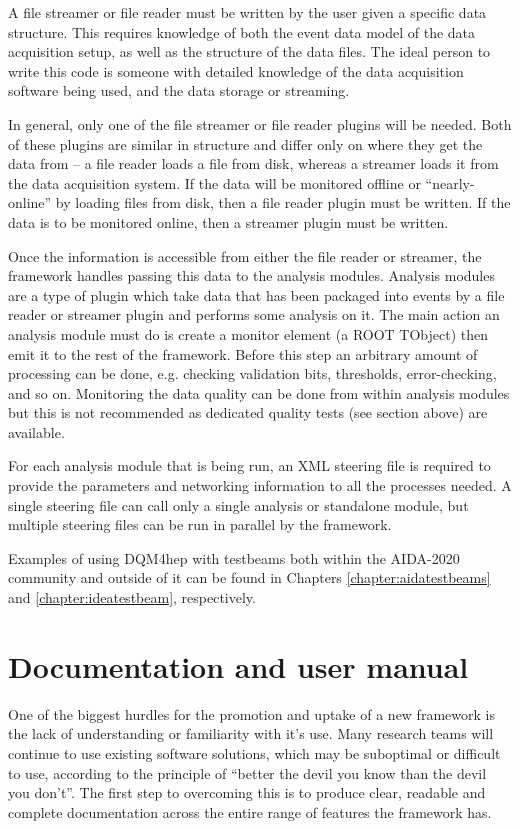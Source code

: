 A file streamer or file reader must be written by the user given a specific data structure. This requires knowledge of both the event data model of the data acquisition setup, as well as the structure of the data files. The ideal person to write this code is someone with detailed knowledge of the data acquisition software being used, and the data storage or streaming. 

In general, only one of the file streamer or file reader plugins will be needed. Both of these plugins are similar in structure and differ only on where they get the data from -- a file reader loads a file from disk, whereas a streamer loads it from the data acquisition system. If the data will be monitored offline or ``nearly-online'' by loading files from disk, then a file reader plugin must be written. If the data is to be monitored online, then a streamer plugin must be written. 

Once the information is accessible from either the file reader or streamer, the framework handles passing this data to the analysis modules. Analysis modules are a type of plugin which take data that has been packaged into events by a file reader or streamer plugin and performs some analysis on it. The main action an analysis module must do is create a monitor element (a ROOT TObject) then emit it to the rest of the framework. Before this step an arbitrary amount of processing can be done, e.g. checking validation bits, thresholds, error-checking, and so on. Monitoring the data quality can be done from within analysis modules but this is not recommended as dedicated quality tests (see section above) are available.

For each analysis module that is being run, an \acrshort{XML} steering file is required to provide the parameters and networking information to all the processes needed. A single steering file can call only a single analysis or standalone module, but multiple steering files can be run in parallel by the framework.

Examples of using \acrshort{DQM4hep} with testbeams both within the AIDA-2020 community and outside of it can be found in Chapters \ref{chapter:aidatestbeams} and \ref{chapter:ideatestbeam}, respectively.

\section{Documentation and user manual} 
One of the biggest hurdles for the promotion and uptake of a new framework is the lack of understanding or familiarity with it's use. Many research teams will continue to use existing software solutions, which may be suboptimal or difficult to use, according to the principle of ``better the devil you know than the devil you don't''. The first step to overcoming this is to produce clear, readable and complete documentation across the entire range of features the framework has.

